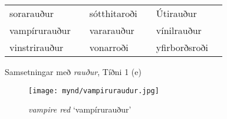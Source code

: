 \documentclass[../samsetningasafn.tex]{subfiles}
\begin{document}
\begin{wordlist}[H]
\begin{tcolorbox}

	\setlength{\extrarowheight}{3pt}
	\begin{tabular}{BlBlBl}		
		sorarauður		&	\phantom{baa}	& 
		sótthitaroði		&	\phantom{baa}	& 
		Útirauður		&	\phantom{baa}	\\ 
		vampírurauður	&		& 
		vararauður		&		& 
		vínilrauður		&		\\ 
		vinstrirauður		&		& 
		vonarroði		&		& 
		yfirborðsroði		&		 
\end{tabular}

\end{tcolorbox}
	\caption{Samsetningar með \textit{rauður}, Tíðni 1 (e)}
	\label{listi:rautt.1e}
\end{wordlist}	

\begin{figure}[H]
\begin{tcolorbox}
\centering
	\texttt{[image: mynd/vampiruraudur.jpg]}
\end{tcolorbox}
	\caption{\textit{vampire red} \lq vampírurauður\rq}
	\label{mynd:vampiruraudur}
\end{figure}
\end{document}

